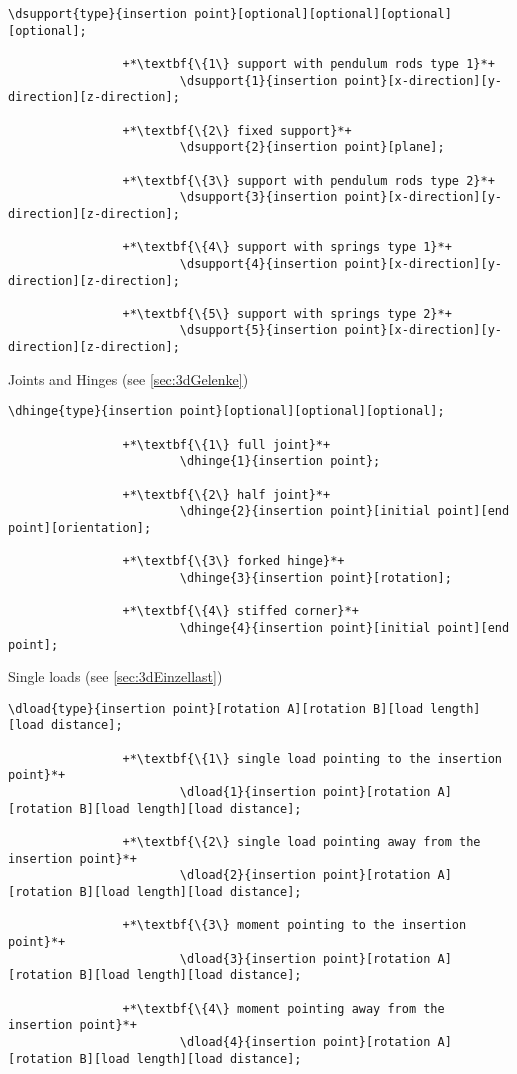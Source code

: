 \documentclass[%
  a4paper,
  BCOR20mm,
  pointlessnumbers,
  twoside,
  halfparskip,
  openright,
]{scrreprt}
\begin{document}
\begin{lstlisting}[emph={dsupport},backgroundcolor=\color{white}]
		\dsupport{type}{insertion point}[optional][optional][optional][optional];
		
				+*\textbf{\{1\} support with pendulum rods type 1}*+
						\dsupport{1}{insertion point}[x-direction][y-direction][z-direction];
						
				+*\textbf{\{2\} fixed support}*+
						\dsupport{2}{insertion point}[plane];
						
				+*\textbf{\{3\} support with pendulum rods type 2}*+
						\dsupport{3}{insertion point}[x-direction][y-direction][z-direction];
						
				+*\textbf{\{4\} support with springs type 1}*+
						\dsupport{4}{insertion point}[x-direction][y-direction][z-direction];
		
				+*\textbf{\{5\} support with springs type 2}*+
						\dsupport{5}{insertion point}[x-direction][y-direction][z-direction];
\end{lstlisting}\vspace{-10mm}

Joints and Hinges (see \ref{sec:3dGelenke})

\begin{lstlisting}[emph={dhinge},backgroundcolor=\color{white}]
		\dhinge{type}{insertion point}[optional][optional][optional];
		
				+*\textbf{\{1\} full joint}*+
						\dhinge{1}{insertion point};
						
				+*\textbf{\{2\} half joint}*+
						\dhinge{2}{insertion point}[initial point][end point][orientation];
						
				+*\textbf{\{3\} forked hinge}*+
						\dhinge{3}{insertion point}[rotation];
		
				+*\textbf{\{4\} stiffed corner}*+
						\dhinge{4}{insertion point}[initial point][end point];								
\end{lstlisting}\vspace{-10mm}

Single loads (see \ref{sec:3dEinzellast})

\begin{lstlisting}[emph={dload},backgroundcolor=\color{white}]
		\dload{type}{insertion point}[rotation A][rotation B][load length][load distance];
		
				+*\textbf{\{1\} single load pointing to the insertion point}*+
						\dload{1}{insertion point}[rotation A][rotation B][load length][load distance];
						
				+*\textbf{\{2\} single load pointing away from the insertion point}*+
						\dload{2}{insertion point}[rotation A][rotation B][load length][load distance];
						
				+*\textbf{\{3\} moment pointing to the insertion point}*+
						\dload{3}{insertion point}[rotation A][rotation B][load length][load distance];
						
				+*\textbf{\{4\} moment pointing away from the insertion point}*+
						\dload{4}{insertion point}[rotation A][rotation B][load length][load distance];
\end{lstlisting}\vspace{-10mm}
\end{document}
